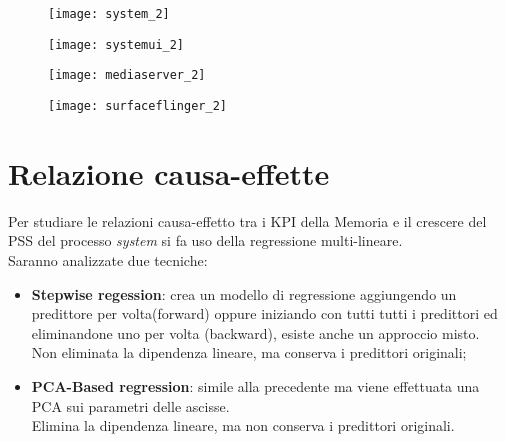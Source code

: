 \begin{minipage}{\linewidth}
  \centering
  \begin{minipage}{0.49\linewidth}
    \begin{figure}[H]
      \texttt{[image: system\_2]}
    \end{figure}
  \end{minipage}
  \begin{minipage}{0.49\linewidth}
    \begin{figure}[H]
      \texttt{[image: systemui\_2]}
    \end{figure}
  \end{minipage}
  \begin{minipage}{0.49\linewidth}
    \begin{figure}[H]
      \texttt{[image: mediaserver\_2]}
    \end{figure}
  \end{minipage}
  \begin{minipage}{0.49\linewidth}
    \begin{figure}[H]
      \texttt{[image: surfaceflinger\_2]}
    \end{figure}
  \end{minipage}
\end{minipage}
\clearpage

\section{Relazione causa-effette}

Per studiare le relazioni causa-effetto tra i KPI della Memoria e il crescere
del PSS del processo \textit{system} si fa uso della regressione multi-lineare.\\
Saranno analizzate due tecniche:

\begin{itemize}
  \item \textbf{Stepwise regession}: crea un modello di regressione aggiungendo
  un predittore per volta(forward) oppure iniziando con tutti tutti i predittori
  ed eliminandone uno per volta (backward), esiste anche un approccio misto.\\
  Non eliminata la dipendenza lineare, ma conserva i predittori originali;
  \item \textbf{PCA-Based regression}: simile alla precedente ma viene effettuata
  una PCA sui parametri delle ascisse.\\
  Elimina la dipendenza lineare, ma non conserva i predittori originali.
\end{itemize}

